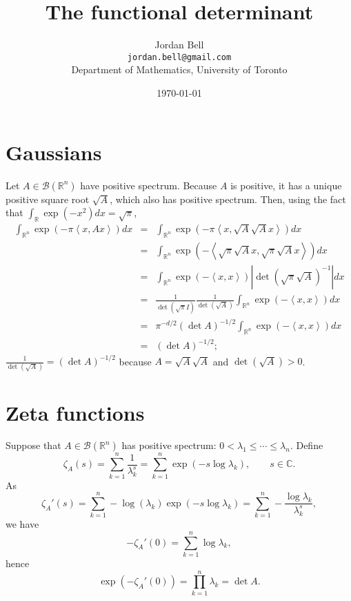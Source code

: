 \documentclass{article}
\newcommand{\inner}[2]{\left\langle #1, #2 \right\rangle}
\theoremstyle{definition}
\begin{document}
\title{The functional determinant}
\author{Jordan Bell\\ \texttt{jordan.bell@gmail.com}\\Department of Mathematics, University of Toronto}
\date{\today}

\maketitle

\section{Gaussians}
Let $A \in \mathscr{B}(\mathbb{R}^n)$ have   positive spectrum. Because $A$ is positive, it has a unique positive square root $\sqrt{A}$, which also
has positive spectrum. Then, using the fact  that $\int_{\mathbb{R}} \exp(-x^2) dx=\sqrt{\pi}$,
\begin{eqnarray*}
\int_{\mathbb{R}^n} \exp(-\pi \inner{x}{Ax}) dx&=&\int_{\mathbb{R}^n} \exp\left(-\pi \inner{x}{\sqrt{A}\sqrt{A}x}\right) dx\\
&=&\int_{\mathbb{R}^n} \exp\left(-\inner{\sqrt{\pi} \sqrt{A}x}{\sqrt{\pi} \sqrt{A}x}\right) dx\\
&=&\int_{\mathbb{R}^n} \exp(-\inner{x}{x}) |\det (\sqrt{\pi} \sqrt{A})^{-1}| dx\\
&=&\frac{1}{\det(\sqrt{\pi} I)} \frac{1}{\det(\sqrt{A})} \int_{\mathbb{R}^n} \exp(-\inner{x}{x}) dx\\
&=&\pi^{-d/2} (\det A)^{-1/2}\int_{\mathbb{R}^n} \exp(-\inner{x}{x}) dx\\
&=&(\det A)^{-1/2};
\end{eqnarray*}
$\frac{1}{\det(\sqrt{A})}=(\det A)^{-1/2}$ because $A=\sqrt{A}\sqrt{A}$ and $\det(\sqrt{A})>0$.



\section{Zeta functions}
Suppose that $A \in \mathscr{B}(\mathbb{R}^n)$ has positive spectrum: $0<\lambda_1 \leq \cdots \leq \lambda_n$.
Define
\[
\zeta_A(s) = \sum_{k=1}^n \frac{1}{\lambda_k^s}=\sum_{k=1}^n \exp(-s\log \lambda_k), \qquad s \in \mathbb{C}.
\]
As
\[
\zeta_A'(s) = \sum_{k=1}^n -\log (\lambda_k) \exp(-s\log \lambda_k)
=\sum_{k=1}^n -\frac{\log \lambda_k}{\lambda_k^s},
\]
we have
\[
-\zeta_A'(0)=\sum_{k=1}^n \log\lambda_k,
\]
 hence
\[
\exp(-\zeta_A'(0)) = \prod_{k=1}^n \lambda_k=\det A.
\]
\end{document}
